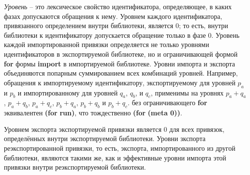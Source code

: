 %
\emph{Уровень} -- это лексическое свойство идентификатора, определяющее, в каких фазах
допускаются обращения к нему. Уровнем каждого идентификатора, привязанного определением внутри
библиотеки, является $0$; то есть, внутри библиотеки к идентификатору допускается обращение
только в фазе $0$. Уровень каждой импортированной привязки определяется не только уровнями
идентификаторов в экспортируемой библиотеке, но и ограничивающей формой {\cf\bfseries for} формы
{\cf\bfseries import} в импортируемой библиотеке. Уровни импорта и экспорта объединяются попарным
суммированием всех комбинаций уровней. Например, обращения к импортируемому идентификатору,
экспортируемому для уровней $p_a$ и $p_b$ и импортированному для уровней $q_a$, $q_b$, и $q_c$,
применимы на уровнях $p_a+q_a$, $p_a+q_b$, $p_a+q_c$, $p_b+q_a$, $p_b+q_b$ и
$p_b+q_c$.  без ограничивающего {\cf\bfseries for} эквивалентен {\cf \textbf{(for}
   \textbf{run)}}, что тождественно {\cf \textbf{(for}
   \bfseries(meta 0))}.

Уровнем экспорта экспортируемой привязки является $0$ для всех привязок, определённых внутри
экспортируемой библиотеки. Уровни зкспорта реэкспортированной привязки, то есть, экспорта,
импортированного из другой библиотеки, являются такими же, как и эффективные уровни импорта этой
привязки внутри реэкспортируемой библиотеки.

